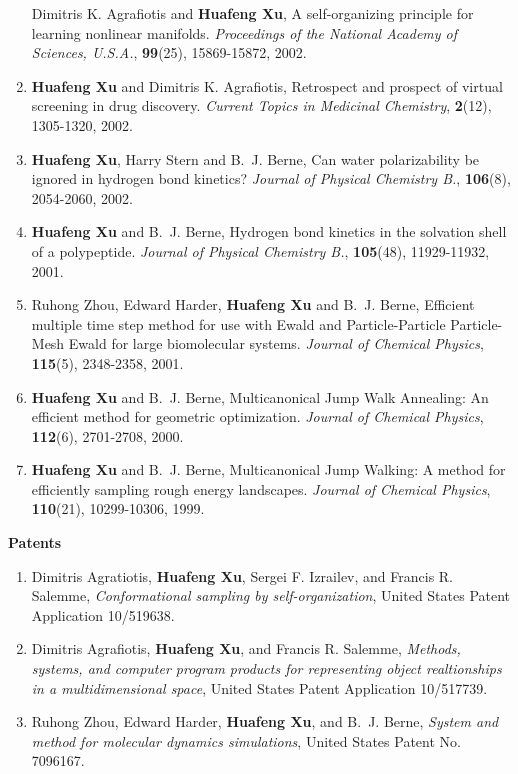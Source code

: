 \documentclass[11pt]{article}
\begin{document}
\begin{enumerate}
Dimitris K. Agrafiotis and \textbf{Huafeng Xu}, A self-organizing principle for learning nonlinear manifolds. \textit{Proceedings of the National Academy of Sciences, U.S.A.}, \textbf{99}(25), 15869-15872, 2002.
\item
\textbf{Huafeng Xu} and Dimitris K. Agrafiotis, Retrospect and prospect of virtual screening in drug discovery. \textit{Current Topics in Medicinal Chemistry}, \textbf{2}(12), 1305-1320, 2002.
\item
\textbf{Huafeng Xu}, Harry Stern and B.~J. Berne, Can water polarizability be ignored in hydrogen bond kinetics? \textit{Journal of Physical Chemistry B.}, \textbf{106}(8), 2054-2060, 2002.
\item
\textbf{Huafeng Xu} and B.~J. Berne, Hydrogen bond kinetics in the solvation shell of a polypeptide. \textit{Journal of Physical Chemistry B.}, \textbf{105}(48), 11929-11932, 2001.
\item
Ruhong Zhou, Edward Harder, \textbf{Huafeng Xu} and B.~J. Berne, Efficient multiple time step method for use with Ewald and Particle-Particle Particle-Mesh Ewald for large biomolecular systems. \textit{Journal of Chemical Physics}, \textbf{115}(5), 2348-2358, 2001.
\item
\textbf{Huafeng Xu} and B.~J. Berne, Multicanonical Jump Walk Annealing: An efficient method for geometric optimization. \textit{Journal of Chemical Physics}, \textbf{112}(6), 2701-2708, 2000.
\item
\textbf{Huafeng Xu} and B.~J. Berne, Multicanonical Jump Walking: A method for efficiently sampling rough energy landscapes. \textit{Journal of Chemical Physics}, \textbf{110}(21), 10299-10306, 1999.

\end{enumerate}

{\large \textbf{Patents}}

\begin{enumerate}
\item
Dimitris Agratiotis, \textbf{Huafeng Xu}, Sergei F. Izrailev, and Francis R. Salemme, \textit{Conformational sampling by self-organization}, United States Patent Application 10/519638.
\item
Dimitris Agrafiotis, \textbf{Huafeng Xu}, and Francis R. Salemme, \textit{Methods, systems, and computer program products for representing object realtionships in a multidimensional space}, United States Patent Application 10/517739.
\item
Ruhong Zhou, Edward Harder, \textbf{Huafeng Xu}, and B.~J. Berne, \textit{System and method for molecular dynamics simulations}, United States Patent No. 7096167.
\end{enumerate}
\end{document}
